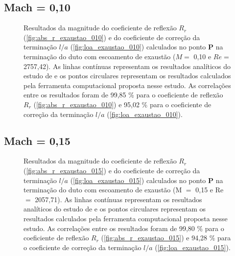\newpage
\subsection{Mach = 0,10}
\begin{figure}[ht!]
\begin{subfigure}{\scaleA \textwidth}
  
\end{subfigure}%
\begin{subfigure}{\scaleA \textwidth}
  
\end{subfigure}
\caption[Resultados de $R_{r}$ e $l/a$ com escoamento de exaustão ($M =$ 0,10 e $Re =$ 2757,42)]{Resultados da magnitude do coeficiente de reflexão $R_{r}$ (\ref{fig:abs_r_exaustao_010}) e do coeficiente de correção da terminação $l/a$ (\ref{fig:loa_exaustao_010}) calculados no ponto $\textbf{P}$ na terminação do duto com escoamento de exaustão ($M =$ 0,10 e $Re =$ 2757,42). As linhas contínuas representam os resultados analíticos do estudo de  e os pontos circulares representam os resultados calculados pela ferramenta computacional proposta nesse estudo. As correlações entre os resultados foram de 99,85 \% para o coeficiente de reflexão $R_{r}$ (\ref{fig:abs_r_exaustao_010}) e 95,02 \% para o coeficiente de correção da terminação $l/a$ (\ref{fig:loa_exaustao_010}).}
\label{fig:resultados_exaustao_010}
\end{figure}


\newpage
\subsection{Mach = 0,15}

\begin{figure}[ht!]
\begin{subfigure}{\scaleA \textwidth}
  
\end{subfigure}%
\begin{subfigure}{\scaleA \textwidth}
  
\end{subfigure}
\caption[Resultados de $R_{r}$ e $l/a$ com escoamento de exaustão (M $=$ 0,15 e Re $=$ 2057,71)]{Resultados da magnitude do coeficiente de reflexão $R_{r}$ (\ref{fig:abs_r_exaustao_015}) e do coeficiente de correção da terminação $l/a$ (\ref{fig:loa_exaustao_015}) calculados no ponto $\textbf{P}$ na terminação do duto com escoamento de exaustão (M $=$ 0,15 e Re $=$ 2057,71). As linhas contínuas representam os resultados analíticos do estudo de  e os pontos circulares representam os resultados calculados pela ferramenta computacional proposta nesse estudo. As correlações entre os resultados foram de 99,80 \% para o coeficiente de reflexão $R_{r}$ (\ref{fig:abs_r_exaustao_015}) e 94,28 \% para o coeficiente de correção da terminação $l/a$ (\ref{fig:loa_exaustao_015}).}
\label{fig:resultados_exaustao_015}
\end{figure}


